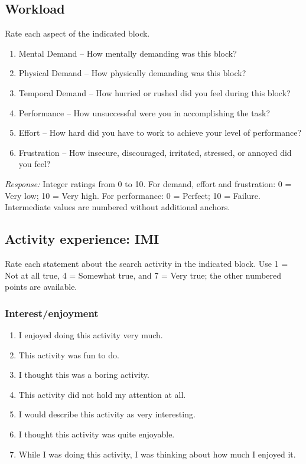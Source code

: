 \subsection{Workload}
Rate each aspect of the indicated block.
\begin{enumerate}
\item Mental Demand -- How mentally demanding was this block?
\item Physical Demand -- How physically demanding was this block?
\item Temporal Demand -- How hurried or rushed did you feel during this block?
\item Performance -- How unsuccessful were you in accomplishing the task?
\item Effort -- How hard did you have to work to achieve your level of performance?
\item Frustration -- How insecure, discouraged, irritated, stressed, or annoyed did you feel?
\end{enumerate}
\textit{Response:} Integer ratings from 0 to 10. For demand, effort and frustration: 0 = Very low; 10 = Very high. For performance: 0 = Perfect; 10 = Failure. Intermediate values are numbered without additional anchors.
\subsection{Activity experience: IMI}
Rate each statement about the search activity in the indicated block. Use 1 = Not at all true, 4 = Somewhat true, and 7 = Very true; the other numbered points are available.
\subsubsection*{Interest/enjoyment}\label{imi1}
\begin{enumerate}
\item I enjoyed doing this activity very much.
\item This activity was fun to do.
\item I thought this was a boring activity.
\item This activity did not hold my attention at all.
\item I would describe this activity as very interesting.
\item I thought this activity was quite enjoyable.
\item While I was doing this activity, I was thinking about how much I enjoyed it.
\end{enumerate}
